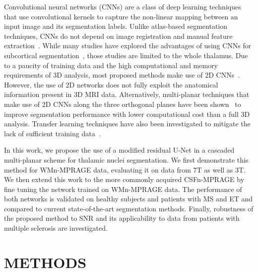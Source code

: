 Convolutional neural networks (CNNs) are a class of deep learning techniques that use convolutional kernels to capture the non-linear mapping between an input image and its segmentation labels. Unlike atlas-based segmentation techniques, CNNs do not depend on image registration and manual feature extraction~\cite{1921968:27964338}. While many studies have explored the advantages of using CNNs for subcortical segmentation~\cite{1921968:27964345,1921968:27964364,1921968:27964361,1921968:27964311}, those studies are limited to the whole thalamus. Due to  a paucity of training data and the high computational and memory requirements of 3D analysis, most proposed methods make use of 2D CNNs~\cite{1921968:27964361}. However, the use of 2D networks does not fully exploit the anatomical information present in 3D MRI data. Alternatively, multi-planar techniques that make use of 2D CNNs along the three orthogonal planes have been shown~\cite{1921968:27964364,1921968:27964355,1921968:27964335,1921968:27964377} to improve segmentation performance with lower computational cost than a full 3D analysis. Transfer learning techniques have also been investigated to mitigate the lack of sufficient training data~\cite{1921968:27964328}.

In this work, we propose the use of a modified residual U-Net in a cascaded multi-planar scheme for thalamic nuclei segmentation. We first demonstrate this method for WMn-MPRAGE \cite{1921968:27964351} data, evaluating it on data from 7T as well as 3T. We then extend this work to the more commonly acquired CSFn-MPRAGE by fine tuning the network trained on WMn-MPRAGE data. The performance of both networks is validated on healthy subjects and patients with MS and ET and compared to current state-of-the-art segmentation methods. Finally, robustness of the proposed method to SNR and its applicability to data from patients with multiple sclerosis are investigated.

\section{METHODS}
